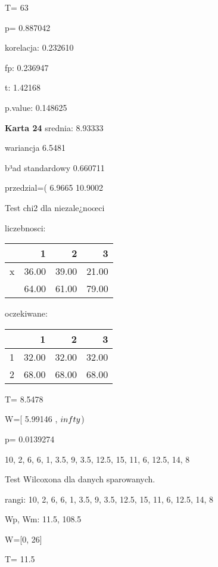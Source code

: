 \documentclass[a4paper,12pt]{article}
\begin{document}
\begin{multicols}{3}
  T=  63 
  
  p= 0.887042 \vspace{1cm} 

  korelacja: 0.232610
     
     fp: 0.236947
     
     t: 1.42168
     
     p.value: 0.148625 \vspace{1cm} 

  \textbf{Karta  24 } 
 srednia: 8.93333 
     
     wariancja 6.5481  
     
     b³ad standardowy 0.660711 
     
     przedzial=( 6.9665 10.9002 \vspace{1cm} 

  Test chi2 dla niezale¿noœci 
   
   liczebnosci: %
\begin{tabular}{rrrr}
  \hline
 & 1 & 2 & 3 \\
  \hline
x & 36.00 & 39.00 & 21.00 \\
   & 64.00 & 61.00 & 79.00 \\
   \hline
\end{tabular}
 
   
   oczekiwane: %
\begin{tabular}{rrrr}
  \hline
 & 1 & 2 & 3 \\
  \hline
1 & 32.00 & 32.00 & 32.00 \\
  2 & 68.00 & 68.00 & 68.00 \\
   \hline
\end{tabular}
 
   
   T= 8.5478 
   
   W=[ 5.99146 , $\\infty$) 
   
   p= 0.0139274 \vspace{1cm} 

  10, 2, 6, 6, 1, 3.5, 9, 3.5, 12.5, 15, 11, 6, 12.5, 14, 8 

  Test Wilcoxona dla danych sparowanych. 
  
  rangi: 10, 2, 6, 6, 1, 3.5, 9, 3.5, 12.5, 15, 11, 6, 12.5, 14, 8 
  
  Wp, Wm:  11.5,  108.5 
  
  W=[0, 26]  
  
  T=  11.5 
  

\end{multicols}
\end{document}

